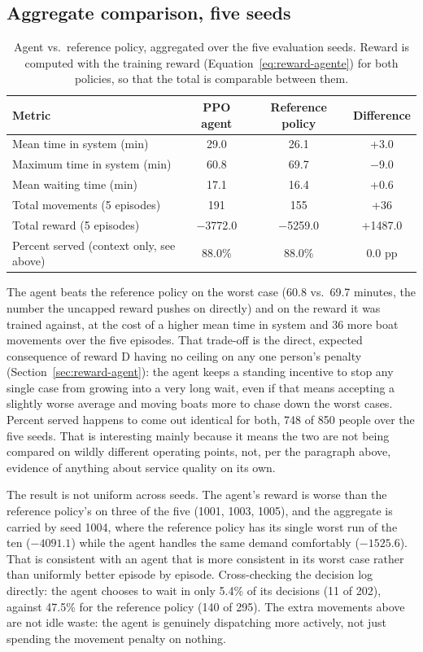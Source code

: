\documentclass[11pt,a4paper]{article}
\begin{document}
\subsection{Aggregate comparison, five seeds}

\begin{table}[H]
\centering
\caption{Agent vs.\ reference policy, aggregated over the five evaluation seeds. Reward is computed with the training reward (Equation~\ref{eq:reward-agente}) for both policies, so that the total is comparable between them.}
\label{tab:comparacion-agregada}
\small
\begin{tabular}{lccc}
\toprule
Metric & PPO agent & Reference policy & Difference \\
\midrule
Mean time in system (min) & 29.0 & 26.1 & +3.0 \\
Maximum time in system (min) & 60.8 & 69.7 & $-$9.0 \\
Mean waiting time (min) & 17.1 & 16.4 & +0.6 \\
Total movements (5 episodes) & 191 & 155 & +36 \\
Total reward (5 episodes) & $-$3772.0 & $-$5259.0 & +1487.0 \\
\midrule
Percent served (context only, see above) & 88.0\% & 88.0\% & 0.0 pp \\
\bottomrule
\end{tabular}
\end{table}

The agent beats the reference policy on the worst case (60.8 vs.\ 69.7 minutes, the number the uncapped reward pushes on directly) and on the reward it was trained against, at the cost of a higher mean time in system and 36 more boat movements over the five episodes. That trade-off is the direct, expected consequence of reward D having no ceiling on any one person's penalty (Section~\ref{sec:reward-agent}): the agent keeps a standing incentive to stop any single case from growing into a very long wait, even if that means accepting a slightly worse average and moving boats more to chase down the worst cases. Percent served happens to come out identical for both, 748 of 850 people over the five seeds. That is interesting mainly because it means the two are not being compared on wildly different operating points, not, per the paragraph above, evidence of anything about service quality on its own.

The result is not uniform across seeds. The agent's reward is worse than the reference policy's on three of the five (1001, 1003, 1005), and the aggregate is carried by seed 1004, where the reference policy has its single worst run of the ten ($-4091.1$) while the agent handles the same demand comfortably ($-1525.6$). That is consistent with an agent that is more consistent in its worst case rather than uniformly better episode by episode. Cross-checking the decision log directly: the agent chooses to wait in only 5.4\% of its decisions (11 of 202), against 47.5\% for the reference policy (140 of 295). The extra movements above are not idle waste: the agent is genuinely dispatching more actively, not just spending the movement penalty on nothing.
\end{document}
